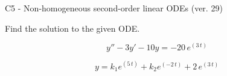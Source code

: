 \begin{exercise}
  \begin{exerciseTitle}C5 - Non-homogeneous second-order linear ODEs (ver. 29)\end{exerciseTitle}
  \begin{exerciseStatement}
    
Find the solution to the given ODE.

    
\[y''-3y'-10y = -20 \, e^{\left(3 \, t\right)}\]

  \end{exerciseStatement}
  \begin{exerciseAnswer}
    
\[y= k_{1} e^{\left(5 \, t\right)} + k_{2} e^{\left(-2 \, t\right)} + 2 \, e^{\left(3 \, t\right)}\]

  \end{exerciseAnswer}
\end{exercise}